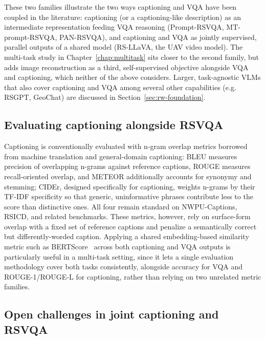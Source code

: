 These two families illustrate the two ways captioning and VQA have been coupled in the literature: captioning (or a captioning-like description) as an intermediate representation feeding VQA reasoning (Prompt-RSVQA, MT-prompt-RSVQA, PAN-RSVQA), and captioning and VQA as jointly supervised, parallel outputs of a shared model (RS-LLaVA, the UAV video model). The multi-task study in Chapter~\ref{chap:multitask} sits closer to the second family, but adds image reconstruction as a third, self-supervised objective alongside VQA and captioning, which neither of the above considers. Larger, task-agnostic VLMs that also cover captioning and VQA among several other capabilities (e.g. RSGPT, GeoChat) are discussed in Section~\ref{sec:rw-foundation}.

\subsection{Evaluating captioning alongside RSVQA}
\label{sec:rw-captioning-metrics}

Captioning is conventionally evaluated with n-gram overlap metrics borrowed from machine translation and general-domain captioning: BLEU measures precision of overlapping n-grams against reference captions, ROUGE measures recall-oriented overlap, and METEOR additionally accounts for synonymy and stemming; CIDEr, designed specifically for captioning, weights n-grams by their TF-IDF specificity so that generic, uninformative phrases contribute less to the score than distinctive ones. All four remain standard on NWPU-Captions, RSICD, and related benchmarks. These metrics, however, rely on surface-form overlap with a fixed set of reference captions and penalize a semantically correct but differently-worded caption. Applying a shared embedding-based similarity metric such as BERTScore~\cite{zhang2020bertscoreevaluatingtextgeneration} across both captioning and VQA outputs is particularly useful in a multi-task setting, since it lets a single evaluation methodology cover both tasks consistently, alongside accuracy for VQA and ROUGE-1/ROUGE-L for captioning, rather than relying on two unrelated metric families.

\subsection{Open challenges in joint captioning and RSVQA}
\label{sec:rw-captioning-challenges}

